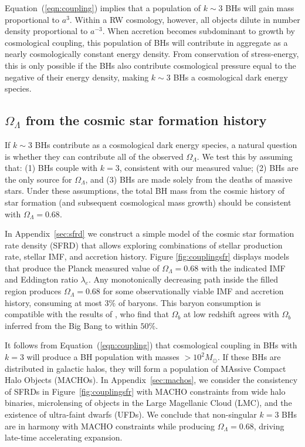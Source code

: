 \documentclass[twocolumn,twocolappendix]{aastex631}
\begin{document}
Equation~(\ref{eqn:coupling}) implies that a population of $k \sim 3$ BHs will gain mass proportional to $a^3$.
Within a RW cosmology, however, all objects dilute in number density proportional to $a^{-3}$.
When accretion becomes subdominant to growth by cosmological coupling, this population of BHs will contribute in aggregate as a nearly cosmologically constant energy density.
From conservation of stress-energy, this is only possible if the BHs also contribute cosmological pressure equal to the negative of their energy density, making $k \sim 3$ BHs a cosmological dark energy species.


\subsection{$\Omega_{\Lambda}$ from the cosmic star formation history}
\label{sec:sfrd_summary}
If $k\sim3$ BHs contribute as a cosmological dark energy species, a natural question is whether they can contribute all of the observed $\Omega_{\Lambda}$.
We test this by assuming that: (1) BHs couple with $k=3$, consistent with our measured value; (2) BHs are the only source for $\Omega_{\Lambda}$, and (3) BHs are made solely from the deaths of massive stars.
Under these assumptions, the total BH mass from the cosmic history of star formation (and subsequent cosmological mass growth) should be consistent with $\Omega_{\Lambda} = 0.68$.

In Appendix~\ref{sec:sfrd} we construct a simple model of the cosmic star formation rate density (SFRD) that allows exploring combinations of stellar production rate, stellar IMF, and accretion history.
Figure \ref{fig:couplingsfr} displays models that produce the Planck measured value of $\Omega_\Lambda = 0.68$ \citep{aghanim2020planck} with the indicated IMF and Eddington ratio $\lambda_e$.
Any monotonically decreasing path inside the filled region produces $\Omega_\Lambda=0.68$ for some observationally viable IMF and accretion history, consuming at most $3\%$ of baryons.
This baryon consumption is compatible with the results of  \citet{macquartfrbbaryons2020}, who find that $\Omega_b$ at low redshift agrees with $\Omega_b$ inferred from the Big Bang to within $50\%$.

It follows from Equation~(\ref{eqn:coupling}) that cosmological coupling in BHs with $k = 3$ will produce a BH population with masses $>10^2M_\odot$.
If these BHs are distributed in galactic halos, they will form a population of MAssive Compact Halo Objects (MACHOs).
In Appendix~\ref{sec:machos}, we consider the consistency of SFRDs in Figure~\ref{fig:couplingsfr} with MACHO constraints from wide halo binaries, microlensing of objects in the Large Magellanic Cloud (LMC), and the existence of ultra-faint dwarfs (UFDs).
We conclude that non-singular $k=3$ BHs are in harmony with MACHO constraints while producing $\Omega_\Lambda = 0.68$, driving late-time accelerating expansion.
\end{document}
